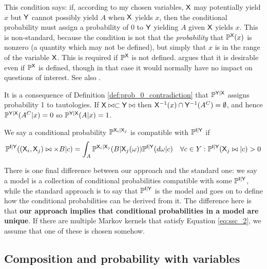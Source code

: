 This condition says: if, according to my chosen variables, $\RV{X}$ may potentially yield $x$ but $\RV{Y}$ cannot possibly yield $A$ when $\RV{X}$ yields $x$, then the conditional probability must assign a probability of 0 to $\RV{Y}$ yielding $A$ given $\RV{X}$ yields $x$. This is non-standard, because the condition is not that the \emph{probability} that $\prob{P}^\RV{X}(x)$ is nonzero (a quantity which may not be defined), but simply that $x$ is in the range of the variable $\RV{X}$. This is required if $\prob{P}^{\RV{X}}$ is not defined. \citet{hajek_what_2003} argues that it is desirable even if $\prob{P}^{\RV{X}}$ is defined, though in that case it would normally have no impact on questions of interest. See also \citet{renyi_conditional_1956}.

It is a consequence of Definition \ref{def:prob_0_contradiction} that $\prob{P}^{\RV{Y}|\RV{X}}$ assigns probability 1 to tautologies. If $\RV{X}\yields x\subset \RV{Y}\yields A$ then $\RV{X}^{-1}(x)\cap \RV{Y}^{-1}(A^C) = \emptyset$, and hence $\prob{P}^{\RV{Y}|\RV{X}}(A^C|x) = 0$ so $\prob{P}^{\RV{Y}|\RV{X}}(A|x) = 1$.

\begin{definition}\label{def:compat_master}
We say a conditional probability $\prob{P}^{\RV{X}_i|\RV{X}_j}$ is compatible with $\prob{P}^{\RV{I}|\RV{Y}}$ if
\begin{align}
	\prob{P}^{\RV{I}|\RV{Y}}((\RV{X}_i,\RV{X}_j)\yields A\times B|c) &= \int_A \prob{P}^{\RV{X}_{i}|\RV{X}_j}(B|\RV{X}_j(\omega))\prob{P}^{\RV{I}|\RV{Y}}(d\omega|c) &\forall c\in Y:\prob{P}^{\RV{I}|\RV{Y}}(\RV{X}_j\yields A|c)>0 \label{eq:ssc_2}
\end{align}
\end{definition}

There is one final difference between our approach and the standard one: we say a model is a collection of conditional probabilities compatible with some $\prob{P}^{\RV{I}|\RV{Y}}$, while the standard approach is to say that $\prob{P}^{\RV{I}|\RV{Y}}$ is the model and goes on to define how the conditional probabilities can be derived from it. The difference here is that \textbf{our approach implies that conditional probabilities in a model are unique}. If there are multiple Markov kernels that satisfy Equation \ref{eq:ssc_2}, we assume that one of these is chosen somehow. 


\subsection{Composition and probability with variables}

